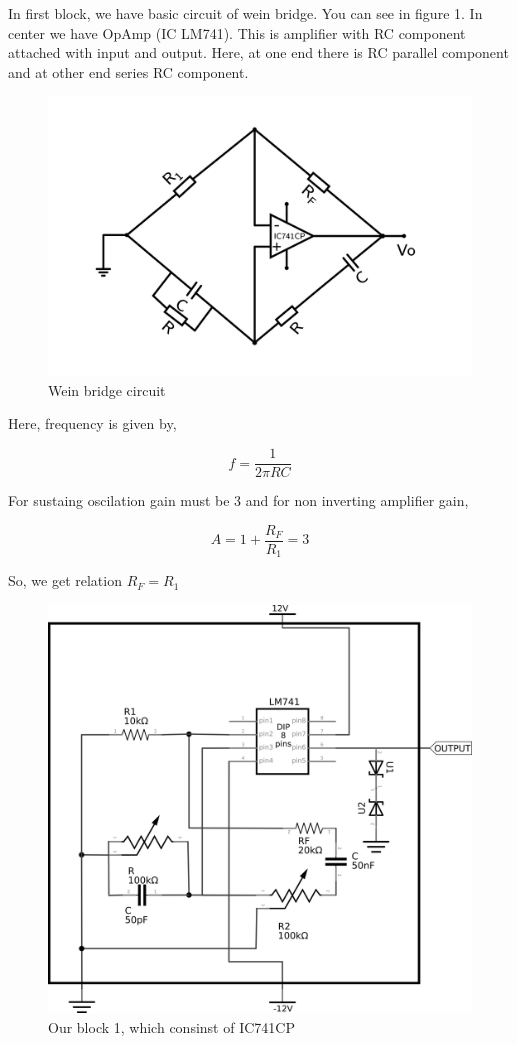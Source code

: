 \documentclass{article}
\begin{document}
In first block, we have basic circuit of wein bridge. You can see in figure 1. In center we have OpAmp (IC LM741). This is amplifier with RC component attached with input and output. Here, at one end there is RC parallel component and at other end series RC component. 

\begin{figure}[htbp]
\centering
\includegraphics[width=.7\textwidth]{imgs/sine.png}
\caption{\label{fig:orgd972286}Wein bridge circuit}
\end{figure}

Here, frequency is given by, 

\begin{equation}
\label{eq:orgb803ed2}
  f =\frac{1}{2 \pi RC}
\end{equation}

For sustaing oscilation gain must be 3 and for non inverting amplifier gain, 

\begin{equation}
\label{eq:orgb4bae7a}
  A = 1+\frac{R_{F}}{R_{1}} = 3
\end{equation}

So, we get relation \(R_{F}=R_{1}\)


\begin{figure}[htbp]
\centering
\includegraphics[width=0.95 \textwidth]{imgs/sinereal.png}
\caption{\label{fig:org22ba6e0}Our block 1, which consinst of IC741CP}
\end{figure}
\end{document}

